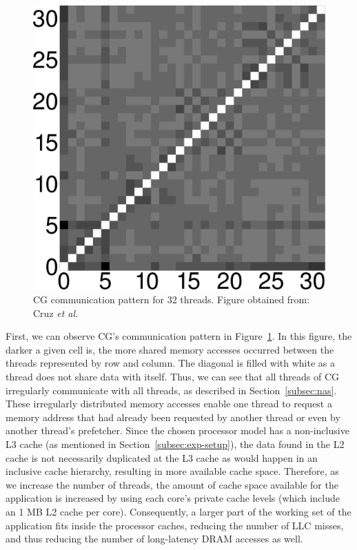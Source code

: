 \documentclass[AMA,final,STIX1COL]{WileyNJD-v2}
\begin{document}
\begin{figure}[!htb]
    \centering
    \includegraphics[width=.25\linewidth]{figures/matrix-cg.pdf}
    \caption{CG communication pattern for 32 threads. Figure obtained from: Cruz \textit{et al.}~\cite{cruz2018thread}}
    \label{fig:figcomma}
\end{figure}



First, we can observe CG's communication pattern in Figure~\ref{fig:figcomma}.
In this figure, the darker a given cell is, the more shared memory accesses occurred between the threads represented by row and column.
The diagonal is filled with white as a thread does not share data with itself.
Thus, we can see that all threads of CG irregularly communicate with all threads, as described in Section~\ref{subsec:nas}.
These irregularly distributed memory accesses enable one thread to request a memory address that had already been requested by another thread or even by another thread's prefetcher.
Since the chosen processor model has a non-inclusive L3 cache (as mentioned in Section~\ref{subsec:exp-setup}), the data found in the L2 cache is not necessarily duplicated at the L3 cache as would happen in an inclusive cache hierarchy, resulting in more available cache space.
Therefore, as we increase the number of threads, the amount of cache space available for the application is increased by using each core's private cache levels (which include an 1 MB L2 cache per core).
Consequently, a larger part of the working set of the application fits inside the processor caches, reducing the number of LLC misses, and thus reducing the number of long-latency DRAM accesses as well. 
\end{document}
